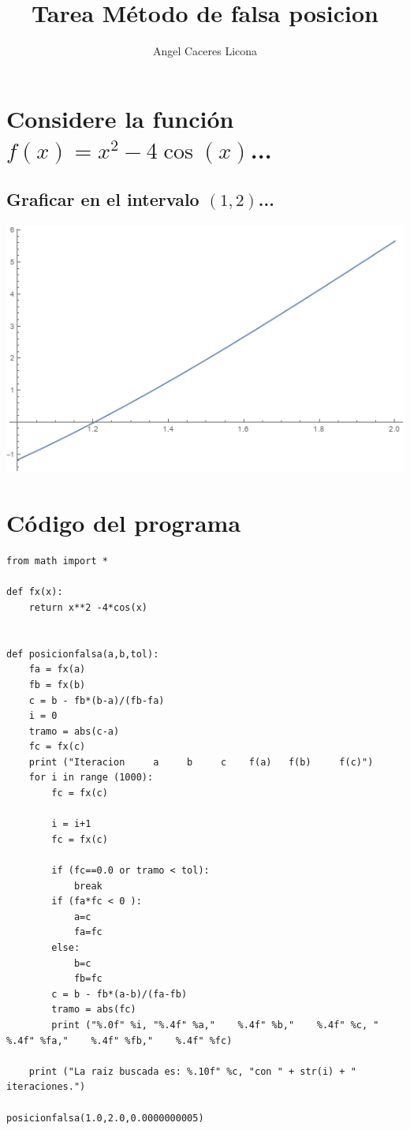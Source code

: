 \documentclass{article}
\begin{document}
\title{Tarea Método de falsa posicion}
\author{Angel Caceres Licona}

\maketitle


\section{Considere la función $f(x) = x^2 -4\cos(x)$...}

\subsection{Graficar en el intervalo $(1,2)$...}


\includegraphics[scale=0.4]{graficaFalsa1.png}



\section{Código del programa}

\begin{lstlisting}
from math import *

def fx(x):
    return x**2 -4*cos(x)


def posicionfalsa(a,b,tol):
    fa = fx(a)
    fb = fx(b)
    c = b - fb*(b-a)/(fb-fa)    
    i = 0
    tramo = abs(c-a)
    fc = fx(c)
    print ("Iteracion     a     b     c    f(a)   f(b)     f(c)")
    for i in range (1000):
        fc = fx(c)
        
        i = i+1
        fc = fx(c)
        
        if (fc==0.0 or tramo < tol):
            break
        if (fa*fc < 0 ):
            a=c
            fa=fc
        else:
            b=c
            fb=fc
        c = b - fb*(a-b)/(fa-fb)
        tramo = abs(fc)
        print ("%.0f" %i, "%.4f" %a,"    %.4f" %b,"    %.4f" %c, "    %.4f" %fa,"    %.4f" %fb,"    %.4f" %fc)

    print ("La raiz buscada es: %.10f" %c, "con " + str(i) + " iteraciones.")    

posicionfalsa(1.0,2.0,0.0000000005)
\end{lstlisting}
\end{document}

